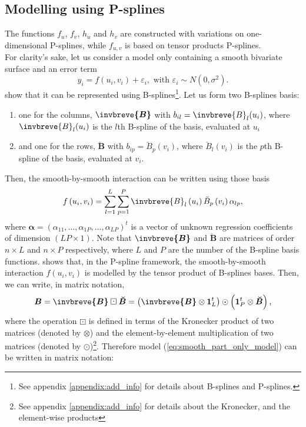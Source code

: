 \subsection{Modelling using P-splines}
The functions $f_u$, $f_v$, $h_u$ and $h_v$ are constructed  with variations on one-dimensional P-splines, while $f_{u,v}$ is based on tensor products P-splines.\\
For clarity's sake, let us consider a model only containing a smooth bivariate surface and an error term
	\begin{equation}
	    y _ { i } = f \left( u _ { i } , v _ { i } \right) + \varepsilon _ { i } , \text { with } \varepsilon _ { i } \sim N 
	    \left( 0 , \sigma ^ { 2 } \right) \text{.}
		\label{eq:smooth_part_only_model}
	\end{equation}
\textcite{lee_efficient_2013} show that it can be represented using B-splines\footnote{See appendix \ref{appendix:add_info} for details about B-splines and P-splines.}. Let us form two B-splines basis:
\begin{enumerate}
\item one for the columns, $\boldsymbol{\invbreve{B}}$ with $ b_{il}= \invbreve{B}_l(u_i)$, where $\invbreve{B}_l(u_i)$ is the $l$th B-spline of the basis, evaluated at $u_i$
\item and one for the rows, $\boldsymbol{\breve{B}}$ with $ b_{ip}= \breve{B}_p(v_i)$, where $\breve{B}_l(v_i)$ is the $p$th B-spline of the basis, evaluated at $v_i$.
\end{enumerate}
Then, the smooth-by-smooth interaction can be written using those basis
\begin{equation}
	f \left(u_{i},v_{i}\right)=\sum_{l=1}^{L}\sum_{p=1}^{P}\invbreve{B}_{l}\left(u_{i}\right)\breve{B}_{p}\left(v_{i}\right) 
	\alpha_{lp}\text{,}
\end{equation}
where $\boldsymbol{\alpha} = (\alpha_{11},\ldots,\alpha_{1P},\ldots,\alpha_{LP})^t$ is a vector of unknown regression coefficients of dimension $(LP \times 1)$. Note that $\boldsymbol{\invbreve{B}}$ and $\boldsymbol{\breve{B}}$ are matrices of order $n \times L$ and $n\times P$ respectively, where $L$ and $P$ are the number of the B-spline basis functions. \textcite{dierckx_curve_1995} shows that, in the P-spline framework, the smooth-by-smooth interaction $f(u_i,v_i)$ is modelled by the tensor product of B-splines bases. Then, we can write, in matrix notation,
\begin{equation}
    \boldsymbol{B} = \boldsymbol{\invbreve{B}} \boxdot \boldsymbol{\breve{B}} = \left( \boldsymbol{\invbreve{B}} \otimes
    \boldsymbol{1} _ { L } ^ { t } \right) \odot \left( \mathbf { 1 } _ { P } ^ { t } \otimes \boldsymbol{\breve{B}} \right)
    \text{,}
\end{equation}
where the operation $\boxdot$ is defined in terms of the Kronecker product of two matrices (denoted by $\otimes$) and the 
element-by-element multiplication of two matrices (denoted by $\odot$)\footnote{See appendix \ref{appendix:add_info} for details 
about the Kronecker, and the element-wise products}. Therefore model (\ref{eq:smooth_part_only_model}) can be written in matrix 
notation:

